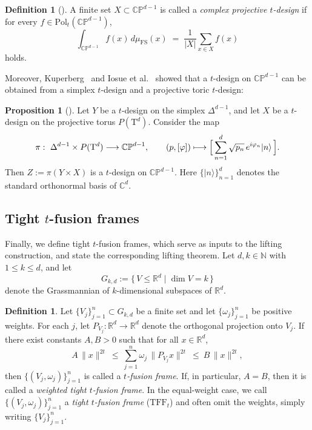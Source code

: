 \documentclass{amsart}
\theoremstyle{definition}
\newtheorem{proposition}[theorem]{Proposition}
\newtheorem{definition}[theorem]{Definition}
\theoremstyle{remark}
\numberwithin{equation}{section}
\newcommand{\R}{{\mathbb R}}
\newcommand{\N}{{\mathbb N}}
\newcommand{\C}{{\mathbb C}}
\newcommand{\CP}{\mathbb{CP}}
\newcommand{\Pol}{\mathrm{Pol}}
\newcommand{\TFF}{\mathrm{TFF}}
\begin{document}
\begin{definition}[{\cite{Hoggar1982}}]
A finite set $X\subset\CP^{d-1}$ is called a \emph{complex projective $t$-design} if for every $f\in\Pol_t(\CP^{d-1})$,
\[
\int_{\CP^{d-1}} f(x)\,d\mu_{\mathrm{FS}}(x)
\;=\;
\frac1{|X|}\sum_{x\in X} f(x)
\]
holds.
\end{definition}

Moreover, Kuperberg~\cite{Kuperberg2006} and Iosue et al.~\cite{IMAEG2024} showed that a $t$-design on $\CP^{d-1}$
can be obtained from a simplex $t$-design and a projective toric $t$-design:

\begin{proposition}[{\cite[Sec.~4.1]{IMAEG2024}}]\label{prop:concatenation}
Let $Y$ be a $t$-design on the simplex $\Delta^{d-1}$, and let $X$ be a $t$-design on the projective torus $P(\mathrm{T}^d)$.
Consider the map
\[
  \pi:\ \Delta^{d-1}\times P(\mathrm{T}^d)\longrightarrow\CP^{d-1}, 
  \qquad
  (p, [\varphi])\longmapsto
  \Bigl[\, \sum_{n=1}^d \sqrt{p_n}\, e^{i\varphi_n}|n\rangle\, \Bigr].
\]
Then
\(
  Z := \pi(Y\times X)
\)
is a $t$-design on $\CP^{d-1}$.
Here $\{|n\rangle\}_{n=1}^d$ denotes the standard orthonormal basis of $\C^{d}$.
\end{proposition}

\subsection{Tight $t$-fusion frames}

Finally, we define tight $t$-fusion frames, which serve as inputs to the lifting construction, and state the corresponding lifting theorem.
Let $d,k \in \N$ with $1\le k\le d$, and let
\[
G_{k,d}:=\{\,V\le \R^d \mid \dim V = k\,\}
\]
denote the Grassmannian of $k$-dimensional subspaces of $\R^d$.

\begin{definition}\cite[Def.~4.1]{BE2013}\label{def:p-fusion-frame}
Let $\{V_j\}_{j=1}^n\subset G_{k,d}$ be a finite set and let $\{\omega_j\}_{j=1}^n$ be positive weights.
For each $j$, let $P_{V_j}:\mathbb{R}^d\to\mathbb{R}^d$ denote the orthogonal projection onto $V_j$.
If there exist constants $A,B>0$ such that for all $x\in\mathbb{R}^d$,
\[
A\,\|x\|^{2t}\ \le\ \sum_{j=1}^n \omega_j\,\|P_{V_j}x\|^{2t}\ \le\ B\,\|x\|^{2t},
\]
then $\{(V_j,\omega_j)\}_{j=1}^n$ is called a \emph{$t$-fusion frame}.
If, in particular, $A=B$, then it is called a \emph{weighted tight $t$-fusion frame}.
In the equal-weight case, we call $\{(V_j,\omega_j)\}_{j=1}^n$ a \emph{tight $t$-fusion frame} ($\TFF_t$) and often omit the weights, simply writing $\{V_j\}_{j=1}^n$.
\end{definition}
\end{document}
